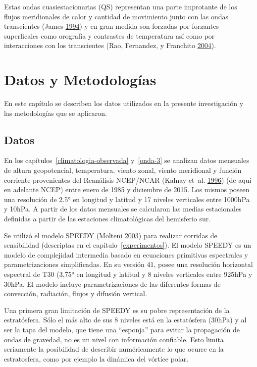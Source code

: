 \documentclass[spanish,a4paper,12p]{book}
\begin{document}
Estas ondas cuasiestacionarias (QS) representan una parte improtante de
los flujos meridionales de calor y cantidad de movimiento junto con las
ondas transcientes (James \protect\hyperlink{ref-James}{1994}) y en gran
medida son forzadas por forzantes superficales como orografía y
contrastes de temperatura así como por interacciones con los
transcientes (Rao, Fernandez, y Franchito
\protect\hyperlink{ref-Rao2004}{2004}).

\chapter{Datos y Metodologías}\label{datos-y-metodologias}

En este capítulo se describen los datos utilizados en la presente
investigación y las metodologías que se aplicaron.

\section{Datos}\label{datos}

En los capítulos~\ref{climatologia-observada} y~\ref{onda-3} se analizan
datos mensuales de altura geopotencial, temperatura, viento zonal,
viento meridional y función corriente provenientes del Reanálisis
NCEP/NCAR (Kalnay et~al. \protect\hyperlink{ref-Kalnay1996}{1996}) (de
aquí en adelante NCEP) entre enero de 1985 y diciembre de 2015. Los
mismos poseen una resolución de 2.5° en longitud y latitud y 17 niveles
verticales entre 1000hPa y 10hPa. A partir de los datos mensuales se
calcularon las medias estacionales definidas a partir de las estaciones
climatológicas del hemisferio sur.

Se utilizó el modelo SPEEDY (Molteni
\protect\hyperlink{ref-Molteni2003}{2003}) para realizar corridas de
sensibilidad (descriptas en el capítulo~\ref{experimentos}). El modelo
SPEEDY es un modelo de complejidad intermedia basado en ecuaciones
primitivas espectrales y parametrizaciones simplificadas. En su versión
41, posee una resolución horizontal espectral de T30 (3,75° en longitud
y latitud y 8 niveles verticales entre 925hPa y 30hPa. El modelo incluye
parametrizaciones de las diferentes formas de convección, radiación,
flujos y difusión vertical.

Una primera gran limitación de SPEEDY es su pobre representación de la
estratósfera. Sólo el más alto de sus 8 niveles está en la estatósfera
(30hPa) y al ser la tapa del modelo, que tiene una ``esponja'' para
evitar la propagación de ondas de gravedad, no es un nivel con
información confiable. Esto limita seriamente la posibilidad de
describir numéricamente lo que ocurre en la estratosfera, como por
ejemplo la dinámica del vórtice polar.
\end{document}

